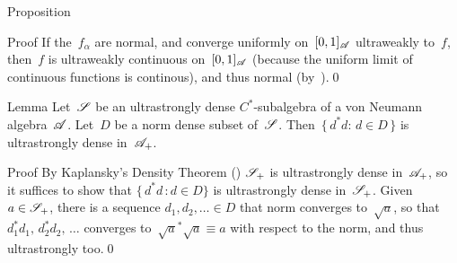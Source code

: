 \documentclass[a]{subfiles}
\begin{document}
\begin{parsec}
\begin{point}{Proposition}
\begin{point}{Proof}
If the~$f_\alpha$ 
are normal,
and converge uniformly on~$[0,1]_{\mathscr{A}}$ ultraweakly
to~$f$,
then~$f$ is ultraweakly continuous
on~$[0,1]_{\mathscr{A}}$
(because the uniform limit of continuous functions is continous),
and thus normal (by~).\qed
\end{point}
\end{point}
\end{parsec}
\begin{parsec}%
\begin{point}{Lemma}%
Let~$\mathscr{S}$ be an ultrastrongly dense $C^*$-subalgebra
of a von Neumann algebra~$\mathscr{A}$.
Let~$D$ be a norm dense subset of~$\mathscr{S}$.
Then~$\{\,d^*d\colon\,d\in D\,\}$
is ultrastrongly dense in~$\mathscr{A}_{+}$.
\begin{point}{Proof}%
By Kaplansky's Density Theorem ()
$\mathscr{S}_{+}$ 
is ultrastrongly dense in~$\mathscr{A}_{+}$,
so it suffices to show that $\{\, d^*d\,\colon d\in D\}$
is ultrastrongly dense in~$\mathscr{S}_{+}$.
Given~$a\in \mathscr{S}_{+}$,
there is a sequence $d_1,d_2,\dotsc \in D$
that norm converges to~$\sqrt{a}$,
so that~$d_1^*d_1,\,d_2^*d_2,\,\dotsc$
converges to~$\sqrt{a}^*\sqrt{a}\equiv a$
with respect to the norm, and thus ultrastrongly too.\qed
\end{point}
\end{point}
\end{parsec}%
\end{document}
